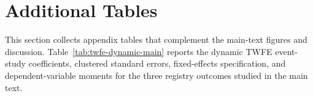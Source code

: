 \section{Additional Tables}
\label{app:additional-tables}

This section collects appendix tables that complement the main-text figures and discussion. Table~\ref{tab:twfe-dynamic-main} reports the dynamic TWFE event-study coefficients, clustered standard errors, fixed-effects specification, and dependent-variable moments for the three registry outcomes studied in the main text.



\begin{table}[htbp]
\centering
\caption{Compositional regressions for decomposition interactions}
\label{tab:compositional-regressions}

\end{table}
